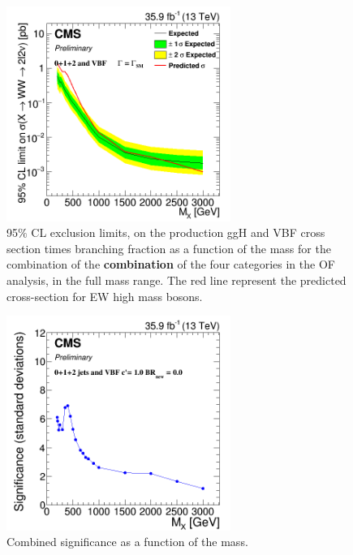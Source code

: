 \begin{figure}[htb]
\centering

\includegraphics[width=0.65\textwidth]{Figs/Limits_OF/c2_ALL.png}

\caption{95$\%$ CL exclusion limits,  on the production ggH and VBF cross section times branching fraction as a function of the mass for the combination of the {\bf combination} of the four categories in the OF analysis, in the full mass range.   The red  line represent the predicted cross-section for EW high mass bosons.}
    \label{fig:lim_OF_comb}
\end{figure}
    


\begin{figure}[htb]
\centering

\includegraphics[width=0.65\textwidth]{Figs/Sig_OF/c1_sig_comb_OF.png}

\caption{Combined significance as a function of the mass.}
    \label{fig:sig_OF_comb}
\end{figure}



